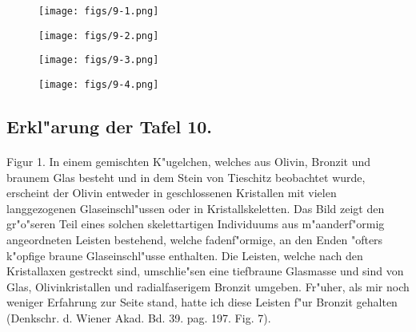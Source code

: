 \documentclass[a4paper, 11pt, oneside, polutonikogreek, german]{article}
\begin{document}
\vspace*{\fill}
\begin{figure}[H]
\centering
\texttt{[image: figs/9-1.png]}
\caption{}
\end{figure}
\vspace*{\fill}
\clearpage

\vspace*{\fill}
\begin{figure}[H]
\centering
\texttt{[image: figs/9-2.png]}
\caption{}
\end{figure}
\vspace*{\fill}
\clearpage

\vspace*{\fill}
\begin{figure}[H]
\centering
\texttt{[image: figs/9-3.png]}
\caption{}
\end{figure}
\vspace*{\fill}
\clearpage

\vspace*{\fill}
\begin{figure}[H]
\centering
\texttt{[image: figs/9-4.png]}
\caption{}
\end{figure}
\vspace*{\fill}
\clearpage

\subsection{Erkl"arung der Tafel 10.}
\paragraph{}
Figur 1. In einem gemischten K"ugelchen, welches aus Olivin, Bronzit und braunem Glas besteht und in dem Stein von Tieschitz beobachtet wurde, erscheint der Olivin entweder in geschlossenen Kristallen mit vielen langgezogenen Glaseinschl"ussen oder in Kristallskeletten. Das Bild zeigt den gr"o"seren Teil eines solchen skelettartigen Individuums aus m"aanderf"ormig angeordneten Leisten bestehend, welche fadenf"ormige, an den Enden "ofters k"opfige braune Glaseinschl"usse enthalten. Die Leisten, welche nach den Kristallaxen gestreckt sind, umschlie"sen eine tiefbraune Glasmasse und sind von Glas, Olivinkristallen und radialfaserigem Bronzit umgeben. Fr"uher, als mir noch weniger Erfahrung zur Seite stand, hatte ich diese Leisten f"ur Bronzit gehalten (Denkschr. d. Wiener Akad. Bd. 39. pag. 197. Fig. 7).
\end{document}
